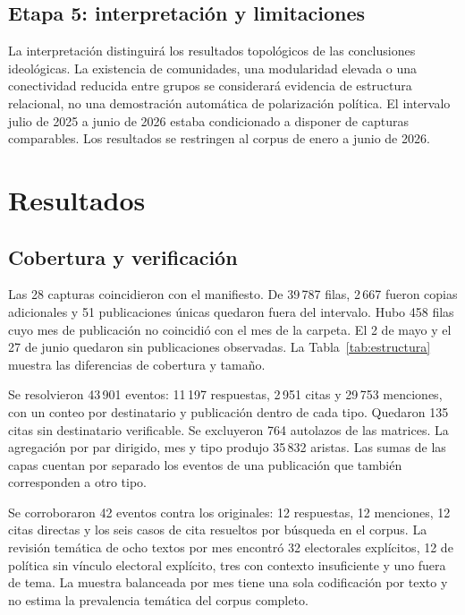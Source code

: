 \documentclass[journal]{IEEEtran}
\begin{document}
\subsection{Etapa 5: interpretación y limitaciones}
La interpretación distinguirá los resultados topológicos de las conclusiones ideológicas. La existencia de comunidades, una modularidad elevada o una conectividad reducida entre grupos se considerará evidencia de estructura relacional, no una demostración automática de polarización política. El intervalo julio de 2025 a junio de 2026 estaba condicionado a disponer de capturas comparables. Los resultados se restringen al corpus de enero a junio de 2026.

\section{Resultados}
\subsection{Cobertura y verificación}
Las 28 capturas coincidieron con el manifiesto. De 39\,787 filas, 2\,667 fueron copias adicionales y 51 publicaciones únicas quedaron fuera del intervalo. Hubo 458 filas cuyo mes de publicación no coincidió con el mes de la carpeta. El 2 de mayo y el 27 de junio quedaron sin publicaciones observadas. La Tabla~\ref{tab:estructura} muestra las diferencias de cobertura y tamaño.

Se resolvieron 43\,901 eventos: 11\,197 respuestas, 2\,951 citas y 29\,753 menciones, con un conteo por destinatario y publicación dentro de cada tipo. Quedaron 135 citas sin destinatario verificable. Se excluyeron 764 autolazos de las matrices. La agregación por par dirigido, mes y tipo produjo 35\,832 aristas. Las sumas de las capas cuentan por separado los eventos de una publicación que también corresponden a otro tipo.

Se corroboraron 42 eventos contra los originales: 12 respuestas, 12 menciones, 12 citas directas y los seis casos de cita resueltos por búsqueda en el corpus. La revisión temática de ocho textos por mes encontró 32 electorales explícitos, 12 de política sin vínculo electoral explícito, tres con contexto insuficiente y uno fuera de tema. La muestra balanceada por mes tiene una sola codificación por texto y no estima la prevalencia temática del corpus completo.
\end{document}

